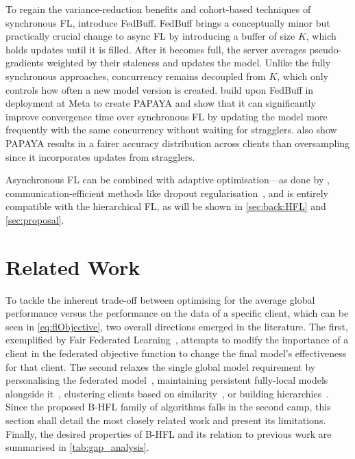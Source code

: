 To regain the variance-reduction benefits and cohort-based techniques of synchronous FL, \citet{FedBuff} introduce FedBuff. FedBuff brings a conceptually minor but practically crucial change to async FL by introducing a buffer of size $K$, which holds updates until it is filled. After it becomes full, the server averages pseudo-gradients weighted by their staleness and updates the model. Unlike the fully synchronous approaches, concurrency remains decoupled from $K$, which only controls how often a new model version is created. \citet{PAPAYA} build upon FedBuff in deployment at Meta to create PAPAYA and show that it can significantly improve convergence time over synchronous FL by updating the model more frequently with the same concurrency without waiting for stragglers. \citet{PAPAYA} also show PAPAYA results in a fairer accuracy distribution across clients than oversampling since it incorporates updates from stragglers.

Asynchronous FL can be combined with adaptive optimisation---as done by \citet{PAPAYA}, communication-efficient methods like dropout regularisation~\citep{AsyncDropout}, and is entirely compatible with the hierarchical FL, as will be shown in \cref{sec:back:HFL} and \cref{sec:proposal}.
\section{Related Work}\label{sec:back:related_work}

To tackle the inherent trade-off between optimising for the average global performance versus the performance on the data of a specific client, which can be seen in \cref{eq:flObjective}, two overall directions emerged in the literature. The first, exemplified by Fair Federated Learning~\citep{QFedAvg}, attempts to modify the importance of a client in the federated objective function to change the final model's effectiveness for that client. The second relaxes the single global model requirement by personalising the federated model~\citep{SalvagingFL,TowardsPersonalisedFL,FLwithNonIID,FinetuningIsFineFL}, maintaining persistent fully-local models alongside it~\citep{FlWithPersonalisationLayers,AdaptivePersonalisedFederatedLearning,FederatedLearningMixtureOfGlobalAndLocal, Ditto}, clustering clients based on similarity~\citep{ThreeApproachesMansour,AnEfficientFrameworkForClusteredFL,Auxo}, or building hierarchies~\citep{Client-Edge-CloudHierFL,Hier_Het_Cellular,OptimalUserEdgeAssingmentHierFL}. Since the proposed B-HFL family of algorithms falls in the second camp, this section shall detail the most closely related work and present its limitations. Finally, the desired properties of B-HFL and its relation to previous work are summarised in \cref{tab:gap_analysis}.


